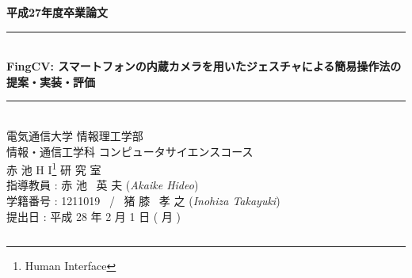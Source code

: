 \documentclass[11pt,a4j, titlepage]{jarticle} %
\begin{document}
\begin{titlepage}
	\begin{center}
		\vspace{8ex}
		{\Large \bf 平成27年度卒業論文}
		\vspace{3ex}\\
		\rule{\hsize}{2mm}
		\vspace{1mm}\\ 
		{\LARGE \bf FingCV: スマートフォンの内蔵カメラを用いたジェスチャによる簡易操作法の提案・実装・評価} 
		\vspace{6mm}\\ 
		\rule{\hsize}{2mm} 
		\vspace{2.5cm} \\ 
		{\Large 電気通信大学 情報理工学部 \\ 
		情報・通信工学科 コンピュータサイエンスコース} 
		\vspace{2ex} \\ 
		\renewcommand{\thefootnote}{\fnsymbol{footnote}} 
		{\Large 赤 池 H I\footnote{Human Interface} 研 究 室} 
		\vspace{3ex} \\ 
		{\Large 指導教員 : 赤 池 \ 英 夫 ({\em Akaike Hideo})} 
		\vspace{3ex} \\
		{\Large 学籍番号 : 1211019 \ / \ 猪 膝 \ 孝 之 ({\em Inohiza Takayuki})} 
		\vspace{5ex} \\ 
		{\Large 提出日 : 平成 28 年 2 月 1 日 ( 月 )} 
		\vspace{-5ex} \\ 
		\begin{verbatim} 
		\end{verbatim} 
	\end{center} 
\end{titlepage}
\end{document}
